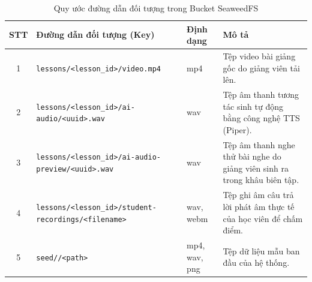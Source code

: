 \documentclass[../DoAn.tex]{subfiles}
\begin{document}
\begin{table}[H]
\centering
\small
\renewcommand{\arraystretch}{1.3}
\begin{tabular}{|c|>{\raggedright\arraybackslash}p{4.8cm}|l|>{\raggedright\arraybackslash}p{5.2cm}|}
\hline
\textbf{STT} & \textbf{Đường dẫn đối tượng (Key)} & \textbf{Định dạng} & \textbf{Mô tả} \\ \hline
1 & \texttt{lessons/\allowbreak <lesson\_id>/\allowbreak video.mp4} & mp4 & Tệp video bài giảng gốc do giảng viên tải lên. \\ \hline
2 & \texttt{lessons/\allowbreak <lesson\_id>/\allowbreak ai-audio/\allowbreak <uuid>.wav} & wav & Tệp âm thanh tương tác sinh tự động bằng công nghệ TTS (Piper). \\ \hline
3 & \texttt{lessons/\allowbreak <lesson\_id>/\allowbreak ai-audio-preview/\allowbreak <uuid>.wav} & wav & Tệp âm thanh nghe thử bài nghe do giảng viên sinh ra trong khâu biên tập. \\ \hline
4 & \texttt{lessons/\allowbreak <lesson\_id>/\allowbreak student-recordings/\allowbreak <filename>} & wav, webm & Tệp ghi âm câu trả lời phát âm thực tế của học viên để chấm điểm. \\ \hline
5 & \texttt{seed//\allowbreak <path>} & mp4, wav, png & Tệp dữ liệu mẫu ban đầu của hệ thống. \\ \hline
\end{tabular}
\caption{Quy ước đường dẫn đối tượng trong Bucket SeaweedFS}
\label{tbl:s3_schema}
\end{table}
\end{document}
